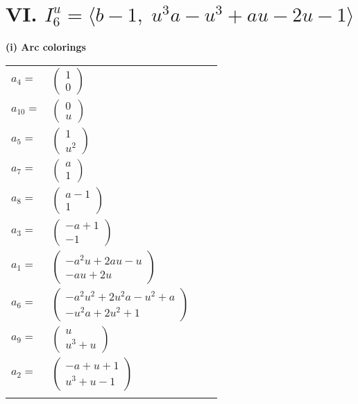 \documentclass[1p]{elsarticle_modified}
\theoremstyle{definition}
\begin{document}
\centering \section*{VI. $I^u_{6}= \langle b-1,\;u^3 a- u^3+a u-2 u-1 \rangle$}
\flushleft \textbf{(i) Arc colorings}\\
\begin{tabular}{m{7pt} m{180pt} m{7pt} m{180pt} }
\flushright $a_{4}=$&$\begin{pmatrix}1\\0\end{pmatrix}$ \\
\flushright $a_{10}=$&$\begin{pmatrix}0\\u\end{pmatrix}$ \\
\flushright $a_{5}=$&$\begin{pmatrix}1\\u^2\end{pmatrix}$ \\
\flushright $a_{7}=$&$\begin{pmatrix}a\\1\end{pmatrix}$ \\
\flushright $a_{8}=$&$\begin{pmatrix}a-1\\1\end{pmatrix}$ \\
\flushright $a_{3}=$&$\begin{pmatrix}- a+1\\-1\end{pmatrix}$ \\
\flushright $a_{1}=$&$\begin{pmatrix}- a^2 u+2 a u- u\\- a u+2 u\end{pmatrix}$ \\
\flushright $a_{6}=$&$\begin{pmatrix}- a^2 u^2+2 u^2 a- u^2+a\\- u^2 a+2 u^2+1\end{pmatrix}$ \\
\flushright $a_{9}=$&$\begin{pmatrix}u\\u^3+u\end{pmatrix}$ \\
\flushright $a_{2}=$&$\begin{pmatrix}- a+u+1\\u^3+u-1\end{pmatrix}$\\&\end{tabular}
\end{document}
